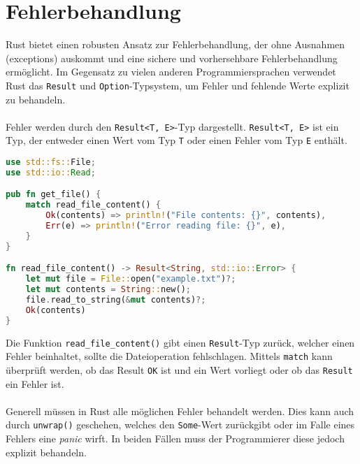 \chapter{Fehlerbehandlung}
Rust bietet einen robusten Ansatz zur Fehlerbehandlung, der ohne Ausnahmen (\glspl{exception}) auskommt und eine sichere und vorhersehbare Fehlerbehandlung ermöglicht. 
Im Gegensatz zu vielen anderen Programmiersprachen verwendet Rust das \texttt{Result} und \texttt{Option}-Typsystem, um Fehler und fehlende Werte explizit zu behandeln.\\
\\
Fehler werden durch den \texttt{Result<T, E>}-Typ dargestellt. \texttt{Result<T, E>} ist ein Typ, der entweder einen Wert vom Typ \texttt{T} oder einen Fehler vom Typ \texttt{E} enthält.

\begin{lstlisting}[language=Rust, caption=Sichere Fehlerbehandlung]
use std::fs::File;
use std::io::Read;

pub fn get_file() {
    match read_file_content() {
        Ok(contents) => println!("File contents: {}", contents),
        Err(e) => println!("Error reading file: {}", e),
    }
}

fn read_file_content() -> Result<String, std::io::Error> {
    let mut file = File::open("example.txt")?;
    let mut contents = String::new();
    file.read_to_string(&mut contents)?;
    Ok(contents)
}
\end{lstlisting}
\noindent
Die Funktion \texttt{read\_file\_content()} gibt einen \texttt{Result}-Typ zurück, welcher einen Fehler beinhaltet, sollte die Dateioperation fehlschlagen. 
Mittels \texttt{match} kann überprüft werden, ob das Result \texttt{OK} ist und ein Wert vorliegt oder ob das \texttt{Result} ein Fehler ist.\\
\\
Generell müssen in Rust alle möglichen Fehler behandelt werden. 
Dies kann auch durch \texttt{unwrap()} geschehen, welches den \texttt{Some}-Wert zurückgibt oder im Falle eines Fehlers eine \textit{\gls{panic}} wirft. 
In beiden Fällen muss der Programmierer diese jedoch explizit behandeln.
